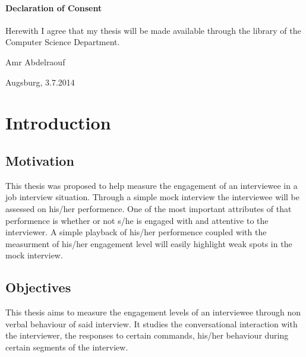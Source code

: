 \documentclass[12pt, a4paper, fleqn]{memoir}%
\begin{document}
\subsubsection*{\LARGE Declaration of Consent}
Herewith I agree that my thesis will be made available through the library of the Computer Science Department.
\vfill
\begin{flushleft}
Amr Abdelraouf
\end{flushleft}  
\begin{flushright}
Augsburg, 3.7.2014 
\end{flushright}
\vfill

\cleardoublepage
\rmfamily
\normalfont
{}
\pagestyle{headings}
\tableofcontents


\mainmatter

\chapter{Introduction}
\label{chap:Introduction}

\section{Motivation}
\label{sec:Motivation}
This thesis was proposed to help measure the engagement of an interviewee in a job interview situation. Through a simple mock interview the interviewee will be assessed on his/her performence. One of the most important attributes of that performence is whether or not s/he is engaged with and attentive to the interviewer. A simple playback of his/her performence coupled with the measurment of his/her engagement level will easily highlight weak spots in the mock interview.

\section{Objectives}
\label{sec:Objectives}
This thesis aims to measure the engagement levels of an interviewee through non verbal behaviour of said interview. It studies the conversational interaction with the interviewer, the responses to certain commands, his/her behaviour during certain segments of the interview.
\end{document}
